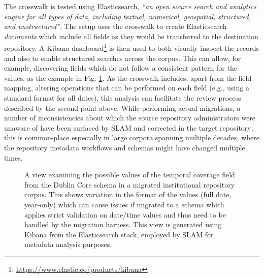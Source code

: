 The crosswalk is tested using Elasticsearch, \emph{``an open source search and analytics engine for all types of data, including textual, numerical, geospatial, structured, and unstructured''}\cite{elastic}. The setup uses the crosswalk to create Elasticsearch \emph{documents} which include all fields as they would be transferred to the destination repository. A Kibana dashboard\footnote{\url{https://www.elastic.co/products/kibana}} is then used to both visually inspect the records and also to enable structured searches across the corpus. This can allow, for example, discovering fields which do not follow a consistent pattern for the values, as the example in Fig. \ref{fig:kibana}. As the crosswalk includes, apart from the field mapping, altering operations that can be performed on each field (e.g., using a standard format for all dates), this analysis can facilitate the review process described by the second point above. While performing actual migrations, a number of inconsistencies about which the source repository administrators were unaware of have been surfaced by SLAM and corrected in the target repository; this is common-place especially in large corpora spanning multiple decades, where the repository metadata workflows and schemas might have changed multiple times.

\begin{figure}[ht!]
  \centering
  \caption{A view examining the possible values of the temporal coverage field from the Dublin Core schema in a migrated institutional repository corpus. This shows variation in the format of the values (full date, year-only) which can cause issues if migrated to a schema which applies strict validation on date/time values and thus need to be handled by the migration harness. This view is generated using Kibana from the Elasticsearch stack, employed by SLAM for metadata analysis purposes.} 
  \label{fig:kibana}
\end{figure}


